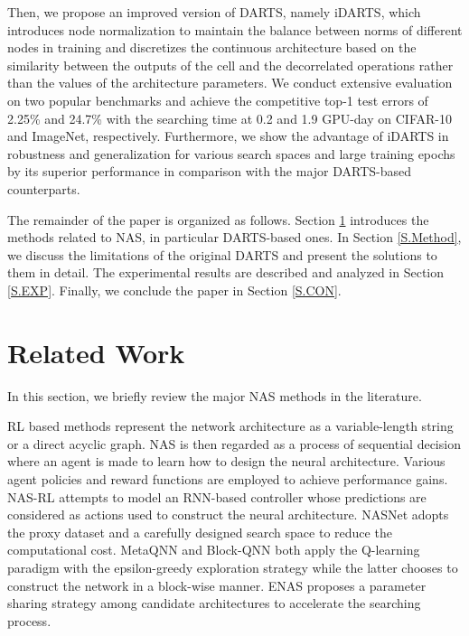 \documentclass[journal]{IEEEtran}
\begin{document}
Then, we propose an improved version of DARTS, namely iDARTS, which introduces node normalization to maintain the balance between norms of different nodes in training and discretizes the continuous architecture based on the similarity between the outputs of the cell and the decorrelated operations rather than the values of the architecture parameters. We conduct extensive evaluation on two popular benchmarks and achieve the competitive top-1 test errors of 2.25\% and 24.7\% with the searching time at 0.2 and 1.9 GPU-day on CIFAR-10 and ImageNet, respectively. Furthermore, we show the advantage of iDARTS in robustness and generalization for various search spaces and large training epochs by its superior performance in comparison with the major DARTS-based counterparts. 

The remainder of the paper is organized as follows.  Section \ref{S.RW} introduces the methods related to NAS, in particular DARTS-based ones. In Section \ref{S.Method}, we discuss the limitations of the original DARTS and present the solutions to them in detail. The experimental results are described and analyzed in Section \ref{S.EXP}. Finally, we conclude the paper in Section \ref{S.CON}.

\section{Related Work}
\label{S.RW}
In this section, we briefly review the major NAS methods in the literature.

RL based methods represent the network architecture as a variable-length string or a direct acyclic graph. NAS is then regarded as a process of sequential decision where an agent is made to learn how to design the neural architecture. Various agent policies and reward functions are employed to achieve performance gains. NAS-RL \cite{DBLP:conf/iclr/ZophL17} attempts to model an RNN-based controller  whose predictions are considered as actions used to construct the neural architecture. NASNet \cite{DBLP:conf/cvpr/ZophVSL18} adopts the proxy dataset and a carefully designed search space to reduce the computational cost. MetaQNN \cite{DBLP:conf/iclr/BakerGNR17} and Block-QNN \cite{DBLP:conf/cvpr/ZhongYWSL18} both apply the Q-learning paradigm with the epsilon-greedy exploration strategy while the latter chooses to construct the network in a block-wise manner. ENAS \cite{DBLP:conf/icml/PhamGZLD18} proposes a parameter sharing strategy among candidate architectures to accelerate the searching process. 
\end{document}
